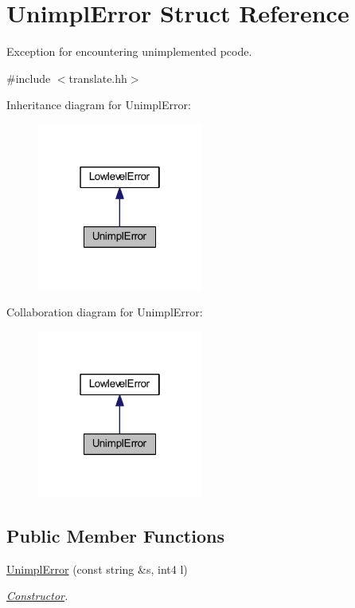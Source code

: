 \hypertarget{struct_unimpl_error}{}\section{Unimpl\+Error Struct Reference}
\label{struct_unimpl_error}


Exception for encountering unimplemented pcode.  




{\ttfamily \#include $<$translate.\+hh$>$}



Inheritance diagram for Unimpl\+Error\+:
\nopagebreak
\begin{figure}[H]
\begin{center}
\leavevmode
\includegraphics[width=154pt]{struct_unimpl_error__inherit__graph}
\end{center}
\end{figure}


Collaboration diagram for Unimpl\+Error\+:
\nopagebreak
\begin{figure}[H]
\begin{center}
\leavevmode
\includegraphics[width=154pt]{struct_unimpl_error__coll__graph}
\end{center}
\end{figure}
\subsection*{Public Member Functions}
\begin{DoxyCompactItemize}
\item 
\mbox{\hyperlink{struct_unimpl_error_aeb883947877420388b4bd020074b2569}{Unimpl\+Error}} (const string \&s, int4 l)
\begin{DoxyCompactList}\small\item\em \mbox{\hyperlink{class_constructor}{Constructor}}. \end{DoxyCompactList}\end{DoxyCompactItemize}
